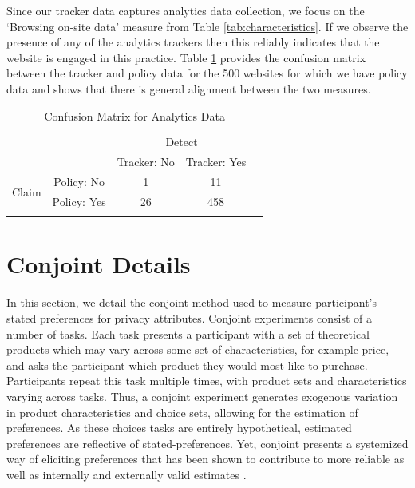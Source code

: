 \documentclass[12pt]{article}
\theoremstyle{definition}
\theoremstyle{remark}
\begin{document}
\begin{appendix}
Since our tracker data captures analytics data collection, we focus on the `Browsing on-site data' measure from Table \ref{tab:characteristics}. If we observe the presence of any of the analytics trackers then this reliably indicates that the website is engaged in this practice. Table \ref{tab:conf_matrices} provides the confusion matrix between the tracker and policy data for the 500 websites for which we have policy data and shows that there is general alignment between the two measures.


\begin{table}[ht]
\centering
\caption{Confusion Matrix for Analytics Data}
\label{tab:conf_matrices}
\begin{tabular}{ccccc}
& & \multicolumn{2}{c}{Detect} & \\
 & & Tracker: No & Tracker: Yes & \\
\hline
\multirow{2}{*}{Claim} & Policy: No & 1 & 11 \\
 & Policy: Yes & 26 & 458 \\
\hline
\\[-1.5ex]
\end{tabular}
\end{table}



\section{Conjoint Details}\label{sec:conjoint_details}

In this section, we detail the conjoint method used to measure participant's stated preferences for privacy attributes. Conjoint experiments consist of a number of tasks. Each task presents a participant with a set of theoretical products which may vary across some set of characteristics, for example price, and asks the participant which product they would most like to purchase. Participants repeat this task multiple times, with product sets and characteristics varying across tasks. Thus, a conjoint experiment generates exogenous variation in product characteristics and choice sets, allowing for the estimation of preferences. As these choices tasks are entirely hypothetical, estimated preferences are reflective of stated-preferences. Yet, conjoint presents a systemized way of eliciting preferences that has been shown to contribute to more reliable as well as internally and externally valid estimates \citep{ALLENBY2019151, doi:10.1287/inte.31.3s.56.9676}. 


\end{appendix}
\end{document}
